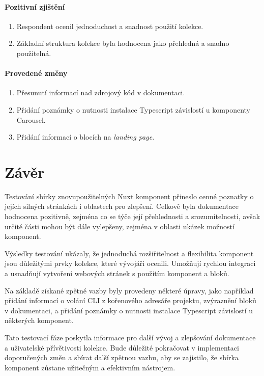 \paragraph{Pozitivní zjištění}
\begin{enumerate}
  \item Respondent ocenil jednoduchost a snadnost použití kolekce.
  \item Základní struktura kolekce byla hodnocena jako přehledná a snadno použitelná.
\end{enumerate}

\paragraph{Provedené změny}
\begin{enumerate}
  \item Přesunutí informací nad zdrojový kód v dokumentaci.
  \item Přidání poznámky o nutnosti instalace Typescript závislostí u komponenty Carousel.
  \item Přidání informací o blocích na \emph{landing page}.
\end{enumerate}

\section{Závěr}
Testování sbírky znovupoužitelných Nuxt komponent přineslo cenné poznatky o jejích silných stránkách i oblastech pro zlepšení. Celkově byla dokumentace hodnocena pozitivně, zejména co se týče její přehlednosti a srozumitelnosti, avšak určité části mohou být dále vylepšeny, zejména v oblasti ukázek možností komponent.

Výsledky testování ukázaly, že jednoduchá rozšiřitelnost a flexibilita komponent jsou důležitými prvky kolekce, které vývojáři ocenili. Umožňují rychlou integraci a usnadňují vytvoření webových stránek s použitím komponent a bloků.

Na základě získané zpětné vazby byly provedeny některé úpravy, jako například přidání informací o volání CLI z kořenového adresáře projektu, zvýraznění bloků v dokumentaci, a přidání poznámky o nutnosti instalace Typescript závislostí u některých komponent.

Tato testovací fáze poskytla informace pro další vývoj a zlepšování dokumentace a uživatelské přívětivosti kolekce. Bude důležité pokračovat v implementaci doporučených změn a sbírat další zpětnou vazbu, aby se zajistilo, že sbírka komponent zůstane užitečným a efektivním nástrojem.
